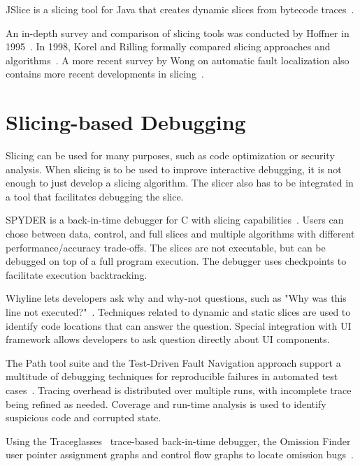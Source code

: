 JSlice is a slicing tool for Java that creates dynamic slices from bytecode traces~\cite{wang08:dynamic_slicing_on_java}.

An in-depth survey and comparison of slicing tools was conducted by Hoffner in 1995~\cite{hoffner95:evaluation_and_comparison}.
In 1998, Korel and Rilling formally compared slicing approaches and algorithms~\cite{korel98:dynamic_program_slicing_methods}.
A more recent survey by Wong \etal on automatic fault localization also contains more recent developments in slicing~\cite{wong16:a_survey_on_software}.

\section{Slicing-based Debugging}
\label{sec:rw_slice_debugging}

Slicing can be used for many purposes, such as code optimization or security analysis.
When slicing is to be used to improve interactive debugging, it is not enough to just develop a slicing algorithm.
The slicer also has to be integrated in a tool that facilitates debugging the slice.

SPYDER is a back-in-time debugger for C with slicing capabilities~\cite{agrawal93:debugging_with_dynamic_slicing}.
Users can chose between data, control, and full slices and multiple algorithms with different performance/accuracy trade-offs.
The slices are not executable, but can be debugged on top of a full program execution.
The debugger uses checkpoints to facilitate execution backtracking.

Whyline lets developers ask why and why-not questions, such as "Why was this line not executed?"~\cite{ko08:debugging_reinvented_asking}.
Techniques related to dynamic and static slices are used to identify code locations that can answer the question.
Special integration with UI framework allows developers to ask question directly about UI components.

The Path tool suite and the Test-Driven Fault Navigation approach support a multitude of debugging techniques for reproducible failures in automated test cases~\cite{perscheid13:test-driven_fault_navigation}.
Tracing overhead is distributed over multiple runs, with incomplete trace being refined as needed.
Coverage and run-time analysis is used to identify suspicious code and corrupted state.

Using the Traceglasses~\cite{sakurai10:traceglasses_a_trace-based_debugger} trace-based back-in-time debugger, the Omission Finder user pointer assignment graphs and control flow graphs to locate omission bugs~\cite{sakurai15:the_omission_finder}.

